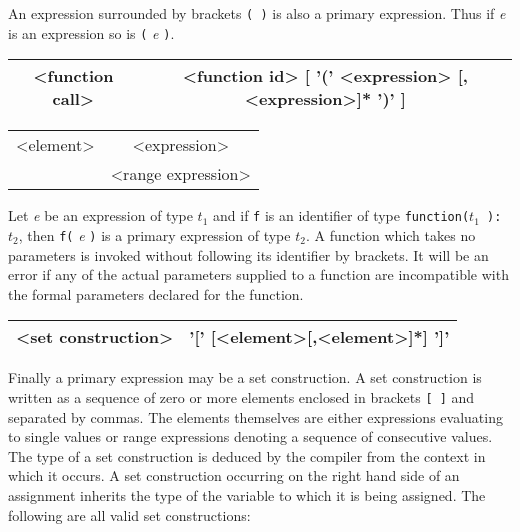 {An expression surrounded by brackets \texttt{( )} is also a primary expression.
Thus if \emph{e} is an expression so is \texttt{(} \emph{e} \texttt{)}. 

\vspace{0.3cm}
{\centering \begin{tabular}{|c|c|}
\hline 
<function call>&
<function id> {[} '(' <expression> {[},<expression>{]}{*} ')' {]}\\
\hline 
\end{tabular}\par}
\vspace{0.3cm}

\vspace{0.3cm}
{\centering \begin{tabular}{|c|c|}
\hline 
<element>&
<expression>\\
&
<range expression>\\
\hline 
\end{tabular}\par}
\vspace{0.3cm}

Let \emph{e} be an expression of type $ t_{1} $ and if \texttt{f} is an identifier
of type \texttt{function($ t_{1} $ ):$ t_{2} $}, then
\texttt{f(} \emph{e} \texttt{)} is a primary expression of type $ t_{2} $.
A function which takes no parameters is invoked without following its identifier
by brackets. It will be an error if any of the actual parameters supplied to
a function are incompatible with the formal parameters declared for the function.

\vspace{0.3cm}
{\centering \begin{tabular}{|c|c|}
\hline 
<set construction>&
'{[}' {[}<element>{[},<element>{]}{*}{]} '{]}'\\
\hline 
\end{tabular}\par}
\vspace{0.3cm}

Finally a primary expression may be a set construction. A set construction is
written as a sequence of zero or more elements enclosed in brackets \texttt{{[}
{]}} and separated by commas. The elements themselves are either expressions
evaluating to single values or range expressions denoting a sequence of consecutive
values. The type of a set construction is deduced by the compiler from the context
in which it occurs. A set construction occurring on the right hand side of an
assignment inherits the type of the variable to which it is being assigned.
The following are all valid set constructions:

}
